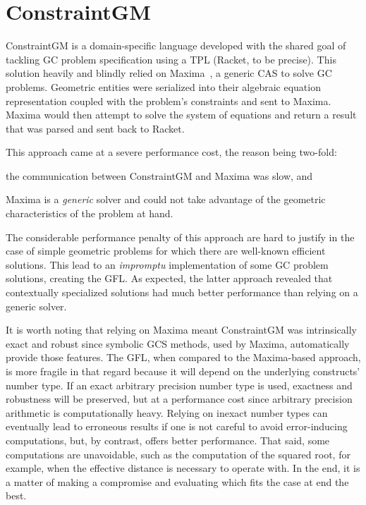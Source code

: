 \section{ConstraintGM}%
\label{sec:eval.cgm}

ConstraintGM is a domain-specific language developed with the shared goal of
tackling \ac{GC} problem specification using a \ac{TPL} (Racket, to be precise).
This solution heavily and blindly relied on Maxima~\cite{Maxima:2021:Maxima}, a
generic \ac{CAS} to solve \ac{GC} problems.  Geometric entities were serialized
into their algebraic equation representation coupled with the problem's
constraints and sent to Maxima.  Maxima would then attempt to solve the system
of equations and return a result that was parsed and sent back to Racket.

This approach came at a severe performance cost, the reason being two-fold:
\begin{enumerate*}[label= (\arabic*)]
  \item the communication between ConstraintGM and Maxima was slow, and
  \item Maxima is a \emph{generic} solver and could not take advantage of the
  geometric characteristics of the problem at hand.
\end{enumerate*}
The considerable performance penalty of this approach are hard to justify in the
case of simple geometric problems for which there are well-known efficient
solutions. This lead to an \textit{impromptu} implementation of some \ac{GC}
problem solutions, creating the \ac{GFL}. As expected, the latter approach
revealed that contextually specialized solutions had much better performance
than relying on a generic solver.

It is worth noting that relying on Maxima meant ConstraintGM was intrinsically
exact and robust since symbolic \ac{GCS} methods, used by Maxima, automatically
provide those features.  The \ac{GFL}, when compared to the Maxima-based
approach, is more fragile in that regard because it will depend on the
underlying constructs' number type.  If an exact arbitrary precision number type
is used, exactness and robustness will be preserved, but at a performance cost
since arbitrary precision arithmetic is computationally heavy.  Relying on
inexact number types can eventually lead to erroneous results if one is not
careful to avoid error-inducing computations, but, by contrast, offers better
performance.  That said, some computations are unavoidable, such as the
computation of the squared root, for example, when the effective distance is
necessary to operate with.  In the end, it is a matter of making a compromise
and evaluating which fits the case at end the best.


